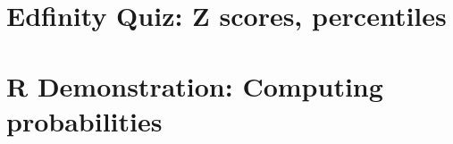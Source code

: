 \documentclass[slidestop,compress,mathserif]{beamer}
\makeatletter
\newcommand{\soln}[1]{\textit{#1}}
\def\chp4@path{../../Chp 4}
\makeatother
\begin{document}

\section{Edfinity Quiz: Z scores, percentiles}


\section{R Demonstration: Computing probabilities}





\end{document}
